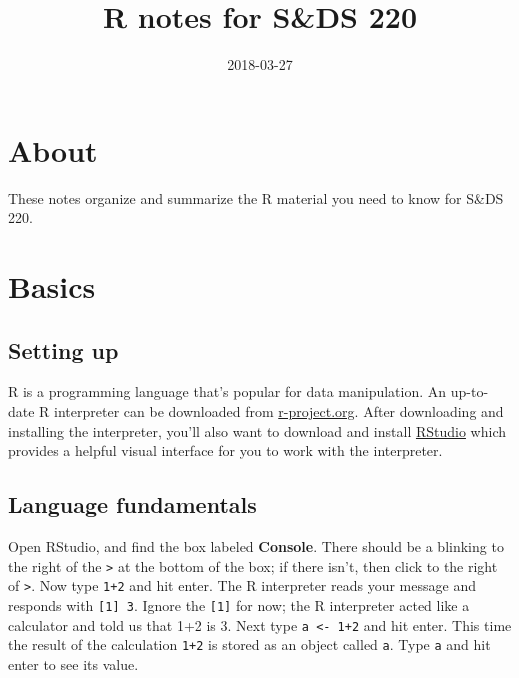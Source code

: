 \documentclass[]{book}
\title{R notes for S\&DS 220}
\author{}
\date{2018-03-27}
\theoremstyle{definition}
\theoremstyle{definition}
\theoremstyle{definition}
\theoremstyle{remark}
\begin{document}
\maketitle

{
\setcounter{tocdepth}{1}
\tableofcontents
}
\hypertarget{about}{%
\chapter*{About}\label{about}}

These notes organize and summarize the R material you need to know for
S\&DS 220.

\hypertarget{basics}{%
\chapter{Basics}\label{basics}}

\hypertarget{setting-up}{%
\section{Setting up}\label{setting-up}}

R is a programming language that's popular for data manipulation. An
up-to-date R interpreter can be downloaded from
\href{https://www.r-project.org/}{r-project.org}. After downloading and
installing the interpreter, you'll also want to download and install
\href{https://www.rstudio.com/}{RStudio} which provides a helpful visual
interface for you to work with the interpreter.

\hypertarget{language-fundamentals}{%
\section{Language fundamentals}\label{language-fundamentals}}

Open RStudio, and find the box labeled \textbf{Console}. There should be
a blinking \texttt{\textbar{}} to the right of the
\texttt{\textgreater{}} at the bottom of the box; if there isn't, then
click to the right of \texttt{\textgreater{}}. Now type \texttt{1+2} and
hit enter. The R interpreter reads your message and responds with
\texttt{{[}1{]}\ 3}. Ignore the \texttt{{[}1{]}} for now; the R
interpreter acted like a calculator and told us that 1+2 is 3. Next type
\texttt{a\ \textless{}-\ 1+2} and hit enter. This time the result of the
calculation \texttt{1+2} is stored as an object called \texttt{a}. Type
\texttt{a} and hit enter to see its value.
\end{document}
